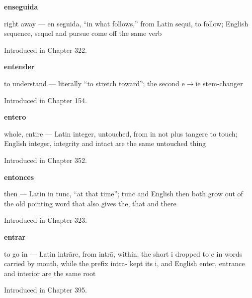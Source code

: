 \noindent\begin{minipage}[t]{\linewidth}
\raggedright
\textbf{enseguida}\par
\small right away — en seguida, \textquotedblleft{}in what follows,\textquotedblright{} from Latin sequi, to follow; English sequence, sequel and pursue come off the same verb\par
\footnotesize Introduced in Chapter 322.
\end{minipage}\par\medskip

\noindent\begin{minipage}[t]{\linewidth}
\raggedright
\textbf{entender}\par
\small to understand — literally \textquotedblleft{}to stretch toward\textquotedblright{}; the second e$\to$ie stem-changer\par
\footnotesize Introduced in Chapter 154.
\end{minipage}\par\medskip

\noindent\begin{minipage}[t]{\linewidth}
\raggedright
\textbf{entero}\par
\small whole, entire — Latin integer, untouched, from in not plus tangere to touch; English integer, integrity and intact are the same untouched thing\par
\footnotesize Introduced in Chapter 352.
\end{minipage}\par\medskip

\noindent\begin{minipage}[t]{\linewidth}
\raggedright
\textbf{entonces}\par
\small then — Latin in tunc, \textquotedblleft{}at that time\textquotedblright{}; tunc and English then both grow out of the old pointing word that also gives the, that and there\par
\footnotesize Introduced in Chapter 323.
\end{minipage}\par\medskip

\noindent\begin{minipage}[t]{\linewidth}
\raggedright
\textbf{entrar}\par
\small to go in — Latin intrāre, from intrā, within; the short i dropped to e in words carried by mouth, while the prefix intra- kept its i, and English enter, entrance and interior are the same root\par
\footnotesize Introduced in Chapter 395.
\end{minipage}\par\medskip

